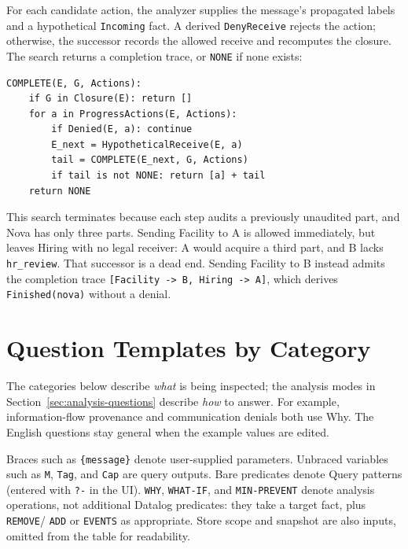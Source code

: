 \documentclass[10pt]{article}
\begin{document}
For each candidate action, the analyzer supplies the message's propagated labels and a
hypothetical \texttt{Incoming} fact. A derived \texttt{DenyReceive} rejects the action;
otherwise, the successor records the allowed receive and recomputes the closure.
The search returns a completion trace, or \texttt{NONE} if none exists:

\begin{rulebox}
\begin{lstlisting}
COMPLETE(E, G, Actions):
    if G in Closure(E): return []
    for a in ProgressActions(E, Actions):
        if Denied(E, a): continue
        E_next = HypotheticalReceive(E, a)
        tail = COMPLETE(E_next, G, Actions)
        if tail is not NONE: return [a] + tail
    return NONE
\end{lstlisting}
\end{rulebox}

This search terminates because each step audits a previously unaudited part, and Nova
has only three parts. Sending Facility to A is allowed immediately, but leaves Hiring
with no legal receiver: A would acquire a third part, and B lacks \texttt{hr\_review}.
That successor is a dead end. Sending Facility to B instead admits the completion
trace \texttt{[Facility -> B, Hiring -> A]}, which derives \texttt{Finished(nova)}
without a denial.


\section{Question Templates by Category}\label{sec:question-catalog}

The categories below describe \emph{what} is being inspected; the analysis modes in
Section~\ref{sec:analysis-questions} describe \emph{how} to answer. For example,
information-flow provenance and communication denials both use Why. The English
questions stay general when the example values are edited.

Braces such as \texttt{\{message\}} denote user-supplied parameters. Unbraced
variables such as \texttt{M}, \texttt{Tag}, and \texttt{Cap} are query outputs.
Bare predicates denote Query patterns (entered with \texttt{?-} in the UI).
\texttt{WHY}, \texttt{WHAT-IF}, and \texttt{MIN-PREVENT} denote analysis operations,
not additional Datalog predicates: they take a target fact, plus \texttt{REMOVE}/
\texttt{ADD} or \texttt{EVENTS} as appropriate. Store scope and snapshot are also
inputs, omitted from the table for readability.
\end{document}

